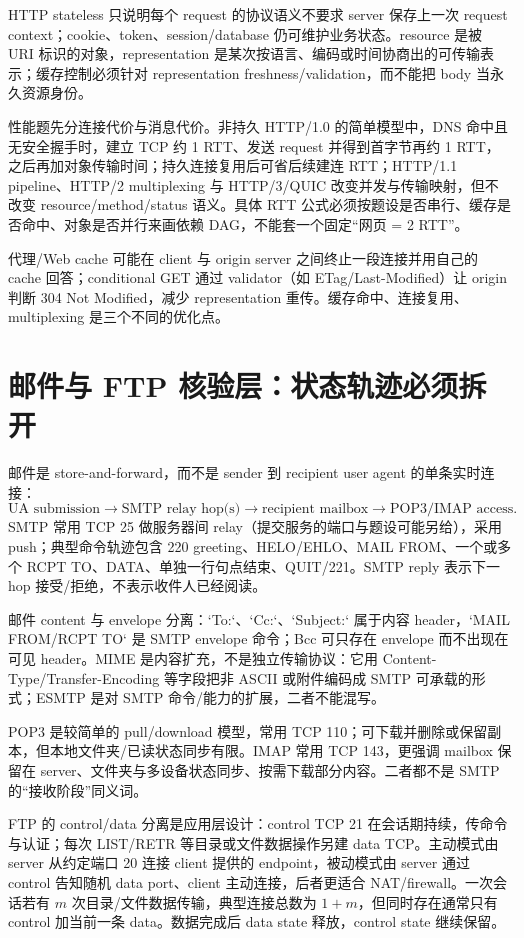 \documentclass[UTF8,fontset=none,11pt,a4paper]{ctexart}
\begin{document}
HTTP stateless 只说明每个 request 的协议语义不要求 server 保存上一次 request context；cookie、token、session/database 仍可维护业务状态。resource 是被 URI 标识的对象，representation 是某次按语言、编码或时间协商出的可传输表示；缓存控制必须针对 representation freshness/validation，而不能把 body 当永久资源身份。

性能题先分连接代价与消息代价。非持久 HTTP/1.0 的简单模型中，DNS 命中且无安全握手时，建立 TCP 约 1 RTT、发送 request 并得到首字节再约 1 RTT，之后再加对象传输时间；持久连接复用后可省后续建连 RTT；HTTP/1.1 pipeline、HTTP/2 multiplexing 与 HTTP/3/QUIC 改变并发与传输映射，但不改变 resource/method/status 语义。具体 RTT 公式必须按题设是否串行、缓存是否命中、对象是否并行来画依赖 DAG，不能套一个固定“网页 = 2 RTT”。

代理/Web cache 可能在 client 与 origin server 之间终止一段连接并用自己的 cache 回答；conditional GET 通过 validator（如 ETag/Last-Modified）让 origin 判断 304 Not Modified，减少 representation 重传。缓存命中、连接复用、multiplexing 是三个不同的优化点。

\section{邮件与 FTP 核验层：状态轨迹必须拆开}

邮件是 store-and-forward，而不是 sender 到 recipient user agent 的单条实时连接：
\[
\text{UA submission}\to\text{SMTP relay hop(s)}\to\text{recipient mailbox}\to\text{POP3/IMAP access}.
\]
SMTP 常用 TCP 25 做服务器间 relay（提交服务的端口与题设可能另给），采用 push；典型命令轨迹包含 220 greeting、HELO/EHLO、MAIL FROM、一个或多个 RCPT TO、DATA、单独一行句点结束、QUIT/221。SMTP reply 表示下一 hop 接受/拒绝，不表示收件人已经阅读。

邮件 content 与 envelope 分离：`To:`、`Cc:`、`Subject:` 属于内容 header，`MAIL FROM/RCPT TO` 是 SMTP envelope 命令；Bcc 可只存在 envelope 而不出现在可见 header。MIME 是内容扩充，不是独立传输协议：它用 Content-Type/Transfer-Encoding 等字段把非 ASCII 或附件编码成 SMTP 可承载的形式；ESMTP 是对 SMTP 命令/能力的扩展，二者不能混写。

POP3 是较简单的 pull/download 模型，常用 TCP 110；可下载并删除或保留副本，但本地文件夹/已读状态同步有限。IMAP 常用 TCP 143，更强调 mailbox 保留在 server、文件夹与多设备状态同步、按需下载部分内容。二者都不是 SMTP 的“接收阶段”同义词。

FTP 的 control/data 分离是应用层设计：control TCP 21 在会话期持续，传命令与认证；每次 LIST/RETR 等目录或文件数据操作另建 data TCP。主动模式由 server 从约定端口 20 连接 client 提供的 endpoint，被动模式由 server 通过 control 告知随机 data port、client 主动连接，后者更适合 NAT/firewall。一次会话若有 $m$ 次目录/文件数据传输，典型连接总数为 $1+m$，但同时存在通常只有 control 加当前一条 data。数据完成后 data state 释放，control state 继续保留。
\end{document}

